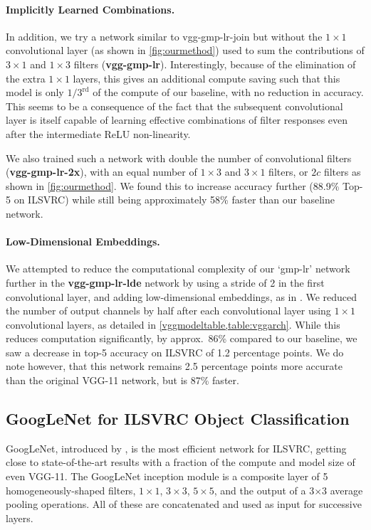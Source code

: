 \documentclass[thesis]{subfiles}
\begin{document}
    \paragraph{Implicitly Learned Combinations.} In addition, we try a network similar to vgg-gmp-lr-join but without the $1 \times 1$ convolutional layer (as shown in \cref{fig:ourmethod}) used to sum the contributions of $3 \times 1$ and $1 \times 3$ filters (\textbf{vgg-gmp-lr}). Interestingly, because of the elimination of the extra $1\times 1$ layers, this gives an additional compute saving such that this model is only $1/3^{\textrm{rd}}$ of the compute of our baseline, with no reduction in accuracy. This seems to be a consequence of the fact that the subsequent convolutional layer is itself capable of learning effective combinations of filter responses even after the intermediate ReLU non-linearity.
    
    We also trained such a network with double the number of convolutional filters (\textbf{vgg-gmp-lr-2x}), \ie with an equal number of $1 \times 3$ and $3 \times 1$ filters, or $2c$ filters as shown in \cref{fig:ourmethod}. We found this to increase accuracy further (88.9\% Top-5 on ILSVRC) while still being approximately 58\% faster than our baseline network.
    
    \paragraph{Low-Dimensional Embeddings.}
    We attempted to reduce the computational complexity of our `gmp-lr' network further in the \textbf{vgg-gmp-lr-lde} network by using a stride of 2 in the first convolutional layer, and adding low-dimensional embeddings, as in \citet{Lin2014,Szegedy2014going}. We reduced the number of output channels by half after each convolutional layer using $1 \times 1$ convolutional layers, as detailed in \cref{vggmodeltable,table:vggarch}. While this reduces computation significantly, by approx.~86\% compared to our baseline, we saw a decrease in top-5 accuracy on ILSVRC of 1.2 percentage points. We do note however, that this network remains 2.5 percentage points more accurate than the original VGG-11 network, but is 87\% faster.
    
    \subsection{GoogLeNet for ILSVRC Object Classification}
    GoogLeNet, introduced by \citet{Szegedy2014going}, is the most efficient network for ILSVRC, getting close to state-of-the-art results with a fraction of the compute and model size of even VGG-11. The GoogLeNet inception module is a composite layer of 5 homogeneously-shaped filters, $1\times 1$, $3\times 3$, $5\times 5$, and the output of a 3$\times$3 average pooling operations. All of these are concatenated and used as input for successive layers. 
    
\end{document}

